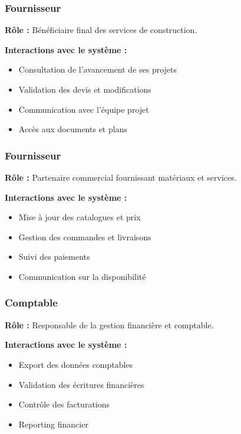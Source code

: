 \subsubsection{Fournisseur}

\textbf{Rôle :} Bénéficiaire final des services de construction.

\textbf{Interactions avec le système :}
\begin{itemize}
    \item Consultation de l'avancement de ses projets
    \item Validation des devis et modifications
    \item Communication avec l'équipe projet
    \item Accès aux documents et plans
\end{itemize}

\subsubsection{Fournisseur}

\textbf{Rôle :} Partenaire commercial fournissant matériaux et services.

\textbf{Interactions avec le système :}
\begin{itemize}
    \item Mise à jour des catalogues et prix
    \item Gestion des commandes et livraisons
    \item Suivi des paiements
    \item Communication sur la disponibilité
\end{itemize}

\subsubsection{Comptable}

\textbf{Rôle :} Responsable de la gestion financière et comptable.

\textbf{Interactions avec le système :}
\begin{itemize}
    \item Export des données comptables
    \item Validation des écritures financières
    \item Contrôle des facturations
    \item Reporting financier
\end{itemize}


